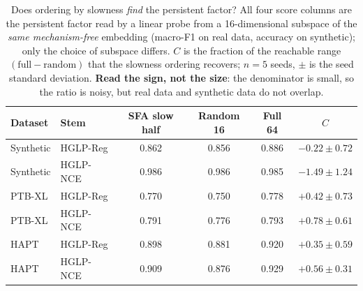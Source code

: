 \begin{table}[!tbp]
\caption{Does ordering by slowness \emph{find} the persistent factor? All four score
columns are the persistent factor read by a linear probe from a 16-dimensional subspace
of the \emph{same mechanism-free} embedding (macro-F1 on real data, accuracy on
synthetic); only the choice of subspace differs. $C$ is the fraction of the reachable
range $(\text{full}-\text{random})$ that the slowness ordering recovers; $n=5$ seeds,
$\pm$ is the seed standard deviation. \textbf{Read the sign, not the size}: the
denominator is small, so the ratio is noisy, but real data and synthetic data do not
overlap.}
\label{tab:metricC}
\centering
\small
\begin{tabular}{llcccc}
\hline
Dataset & Stem & SFA slow half & Random 16 & Full 64 & $C$ \\
\hline
Synthetic & HGLP-Reg & 0.862 & 0.856 & 0.886 & $\mathbf{-0.22} \pm 0.72$ \\
Synthetic & HGLP-NCE & 0.986 & 0.986 & 0.985 & $\mathbf{-1.49} \pm 1.24$ \\
PTB-XL & HGLP-Reg & 0.770 & 0.750 & 0.778 & $\mathbf{+0.42} \pm 0.73$ \\
PTB-XL & HGLP-NCE & 0.791 & 0.776 & 0.793 & $\mathbf{+0.78} \pm 0.61$ \\
HAPT & HGLP-Reg & 0.898 & 0.881 & 0.920 & $\mathbf{+0.35} \pm 0.59$ \\
HAPT & HGLP-NCE & 0.909 & 0.876 & 0.929 & $\mathbf{+0.56} \pm 0.31$ \\
\hline
\end{tabular}
\end{table}
